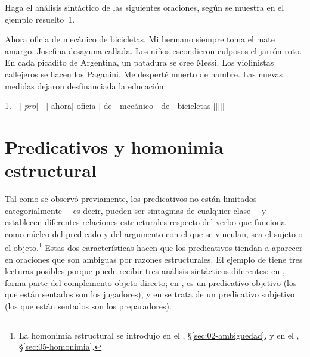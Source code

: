 \begin{ejercicio}\label{ej:09-analisis}
Haga el análisis sintáctico de las siguientes oraciones, según se muestra en el
ejemplo resuelto~1.

\begin{exe}
  \ex Ahora oficia de mecánico de bicicletas.
  \ex Mi hermano siempre toma el mate amargo.
  \ex Josefina desayuna callada.
  \ex Los niños escondieron culposos el jarrón roto.
  \ex En cada picadito de Argentina, un patadura se cree Messi.
  \ex Los violinistas callejeros se hacen los Paganini.
  \ex Me desperté muerto de hambre.
  \ex Las nuevas medidas dejaron desfinanciada la educación.
\end{exe}

\begin{resuelto}
1. [ [ \textit{pro}] [ [
ahora] oficia [ de [
mecánico [ de [
bicicletas]]]]]]
\end{resuelto}
\end{ejercicio}

\section{Predicativos y homonimia estructural}\label{sec:09-homonimia}

Tal como se observó previamente, los predicativos no están limitados
categorialmente ---es decir, pueden ser sintagmas de cualquier clase--- y
establecen diferentes relaciones estructurales respecto del verbo que funciona
como núcleo del predicado y del argumento con el que se vinculan, sea el sujeto
o el objeto.\footnote{La homonimia estructural se introdujo en el ,
§\ref{sec:02-ambiguedad}, y en el , §\ref{sec:05-homonimia}.} Estas
dos características hacen que los predicativos tiendan a aparecer en oraciones
que son ambiguas por razones estructurales. El ejemplo de
 tiene tres lecturas posibles porque puede recibir tres
análisis sintácticos diferentes: en , 
forma parte del complemento objeto directo; en ,
 es un predicativo objetivo (los que están sentados son los
jugadores), y en  se trata de un predicativo subjetivo
(los que están sentados son los preparadores).

